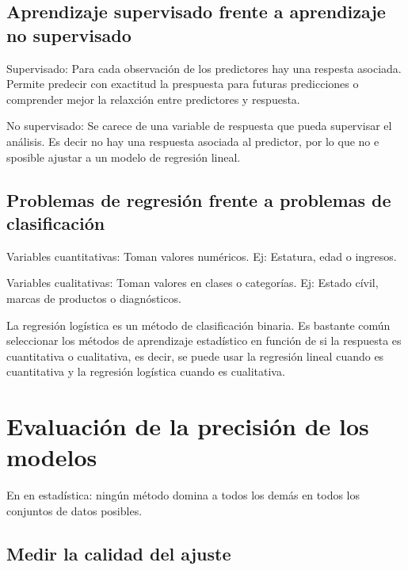 \documentclass[
  letterpaper,
  DIV=11,
  numbers=noendperiod]{scrartcl}
\begin{document}
\hypertarget{aprendizaje-supervisado-frente-a-aprendizaje-no-supervisado}{%
\subsection{Aprendizaje supervisado frente a aprendizaje no
supervisado}\label{aprendizaje-supervisado-frente-a-aprendizaje-no-supervisado}}

Supervisado: Para cada observación de los predictores hay una respesta
asociada. Permite predecir con exactitud la prespuesta para futuras
predicciones o comprender mejor la relaxción entre predictores y
respuesta.

No supervisado: Se carece de una variable de respuesta que pueda
supervisar el análisis. Es decir no hay una respuesta asociada al
predictor, por lo que no e sposible ajustar a un modelo de regresión
lineal.

\hypertarget{problemas-de-regresiuxf3n-frente-a-problemas-de-clasificaciuxf3n}{%
\subsection{Problemas de regresión frente a problemas de
clasificación}\label{problemas-de-regresiuxf3n-frente-a-problemas-de-clasificaciuxf3n}}

Variables cuantitativas: Toman valores numéricos. Ej: Estatura, edad o
ingresos.

Variables cualitativas: Toman valores en clases o categorías. Ej: Estado
cívil, marcas de productos o diagnósticos.

La regresión logística es un método de clasificación binaria. Es
bastante común seleccionar los métodos de aprendizaje estadístico en
función de si la respuesta es cuantitativa o cualitativa, es decir, se
puede usar la regresión lineal cuando es cuantitativa y la regresión
logística cuando es cualitativa.

\hypertarget{evaluaciuxf3n-de-la-precisiuxf3n-de-los-modelos}{%
\section{Evaluación de la precisión de los
modelos}\label{evaluaciuxf3n-de-la-precisiuxf3n-de-los-modelos}}

En en estadística: ningún método domina a todos los demás en todos los
conjuntos de datos posibles.

\hypertarget{medir-la-calidad-del-ajuste}{%
\subsection{Medir la calidad del
ajuste}\label{medir-la-calidad-del-ajuste}}
\end{document}
